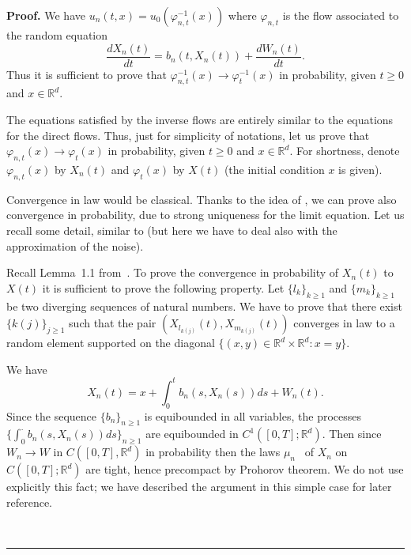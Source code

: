 \documentclass[a4paper,11pt]{article}
\newenvironment{proof}[1][Proof]{\textbf{#1.} }{\ \rule{0.5em}{0.5em}}
\begin{document}
\begin{proof}
We have $u_{n}\left( t,x\right) =u_{0}\left( \varphi _{n,t}^{-1}\left(
x\right) \right) $ where $\varphi _{n,t}$ is the flow associated to the
random equation
\begin{equation*}
\frac{dX_{n}\left( t\right) }{dt}=b_{n}\left( t,X_{n}\left( t\right) \right)
+\frac{dW_{n}\left( t\right) }{dt}.
\end{equation*}
Thus it is sufficient to prove that $\varphi _{n,t}^{-1}\left( x\right)
\rightarrow \varphi _{t}^{-1}\left( x\right) $ in probability, given $t\geq 0
$ and $x\in \mathbb{R}^{d}$.

The equations satisfied by the inverse flows are entirely similar to the
equations for the direct flows. Thus, just for simplicity of notations, let
us prove that $\varphi _{n,t}(x)\rightarrow \varphi _{t}(x)$ in probability,
given $t\geq 0$ and $x\in \mathbb{R}^{d}$. For shortness, denote $\varphi
_{n,t}(x)$ by $X_{n}(t)$ and $\varphi _{t}(x)$ by $X(t)$ (the initial
condition $x$ is given).

Convergence in law would be classical. Thanks to the idea of \cite{GK}, we
can prove also convergence in probability, due to strong uniqueness for the
limit equation. Let us recall some detail, similar to \cite{GK} (but here we
have to deal also with the approximation of the noise).

Recall Lemma~1.1 from~\cite{GK}. To prove the convergence in probability of $%
X_{n}(t)$ to $X(t)$ it is sufficient to prove the following property. Let $%
\{l_{k}\}_{k\geq 1}$ and $\{m_{k}\}_{k\geq 1}$ be two diverging sequences of
natural numbers. We have to prove that there exist $\{k(j)\}_{j\geq 1}$ such
that the pair $(X_{l_{k(j)}}(t),X_{m_{k(j)}}(t))$ converges in law to a
random element supported on the diagonal $\{(x,y)\in \mathbb{R}^{d}\times
\mathbb{R}^{d}:x=y\}$.

We have
\begin{equation*}
X_{n}(t)=x+\int_{0}^{t}b_{n}(s,X_{n}(s))ds+W_{n}(t).
\end{equation*}
Since the sequence $\{b_{n}\}_{n\geq 1}$ is equibounded in all variables,
the processes $\{\int_{0}^{\cdot }b_{n}(s,X_{n}(s))ds\}_{n\geq 1}$ are
equibounded in $C^{1}([0,T];\mathbb{R}^{d})$. Then since $W_{n}\rightarrow W$
in $C([0,T],\mathbb{R}^{d})$ in probability then the laws $\mu _{n}$ \ of $%
X_{n}$ on $C([0,T];\mathbb{R}^{d})$ are tight, hence precompact by Prohorov
theorem. We do not use explicitly this fact; we have described the argument
in this simple case for later reference.


\end{proof}
\end{document}
